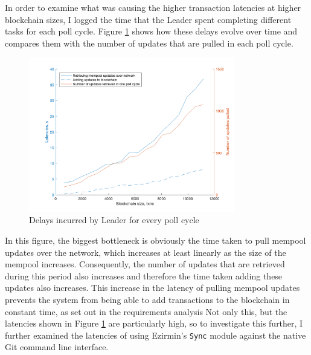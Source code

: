 \documentclass[12pt,a4paper,twoside,openright]{report}
\begin{document}
	In order to examine what was causing the higher transaction latencies at higher blockchain sizes, I logged the time that the Leader spent completing different tasks for each poll cycle.
	Figure \ref{figs:leaderdelays} shows how these delays evolve over time and compares them with the number of updates that are pulled in each poll cycle.
	\begin{figure}
		\centering
		\includegraphics[width=0.8\textwidth]{figs/leader_delays_num_pulled.png}
		\caption{Delays incurred by Leader for every poll cycle}
		\label{figs:leaderdelays}
	\end{figure}
	In this figure, the biggest bottleneck is obviously the time taken to pull mempool updates over the network, which increases at least linearly as the size of the mempool increases.
	Consequently, the number of updates that are retrieved during this period also increases and therefore the time taken adding these updates also increases.
	This increase in the latency of pulling mempool updates prevents the system from being able to add transactions to the blockchain in constant time, as set out in the requirements analysis %
	Not only this, but the latencies shown in Figure \ref{figs:leaderdelays} are particularly high, so to investigate this further, I further examined the latencies of using Ezirmin's \texttt{Sync} module against the native Git command line interface. \\
\end{document}
